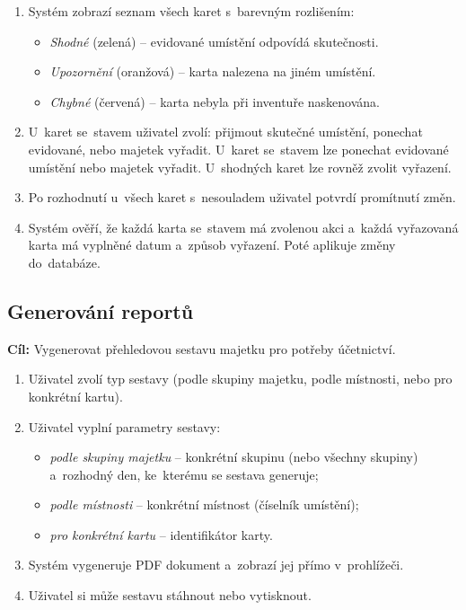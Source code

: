 \begin{enumerate}
	\item Systém zobrazí seznam všech karet s~barevným rozlišením:
	\begin{itemize}
		\item \textit{Shodné} (zelená) -- evidované umístění odpovídá skutečnosti.
		\item \textit{Upozornění} (oranžová) -- karta nalezena na jiném umístění.
		\item \textit{Chybné} (červená) -- karta nebyla při inventuře naskenována.
	\end{itemize}
	\item U~karet se~stavem  uživatel zvolí: přijmout skutečné umístění, ponechat evidované, nebo majetek vyřadit. U~karet se~stavem  lze ponechat evidované umístění nebo majetek vyřadit. U~shodných karet lze rovněž zvolit vyřazení.
	\item Po rozhodnutí u~všech karet s~nesouladem uživatel potvrdí promítnutí změn.
	\item Systém ověří, že každá karta se~stavem  má zvolenou akci a~každá vyřazovaná karta má vyplněné datum a~způsob vyřazení. Poté aplikuje změny do~databáze.
\end{enumerate}

\subsection{Generování reportů}

\textbf{Cíl:} Vygenerovat přehledovou sestavu majetku pro potřeby účetnictví.

\begin{enumerate}
	\item Uživatel zvolí typ sestavy (podle skupiny majetku, podle místnosti, nebo pro konkrétní kartu).
	\item Uživatel vyplní parametry sestavy:
		\begin{itemize}
			\item \textit{podle skupiny majetku} -- konkrétní skupinu (nebo všechny skupiny) a~rozhodný den, ke~kterému se sestava generuje;
			\item \textit{podle místnosti} -- konkrétní místnost (číselník umístění);
			\item \textit{pro konkrétní kartu} -- identifikátor karty.
		\end{itemize}
	\item Systém vygeneruje PDF dokument a~zobrazí jej přímo v~prohlížeči.
	\item Uživatel si může sestavu stáhnout nebo vytisknout.
\end{enumerate}

